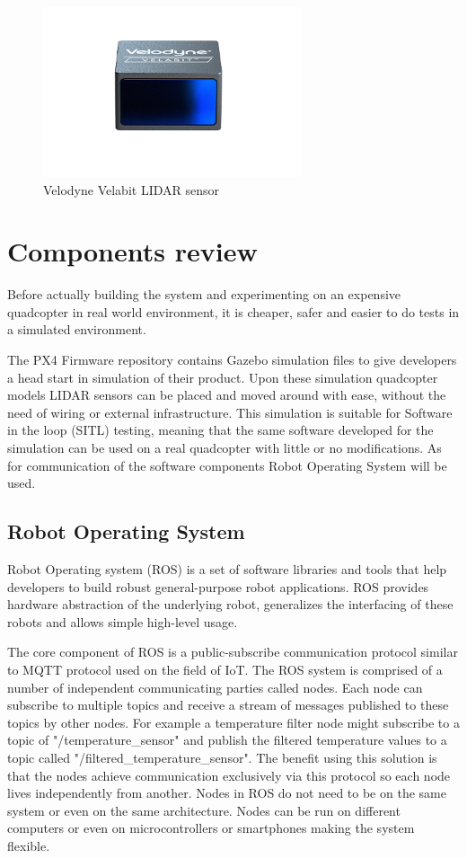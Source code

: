 \begin{figure}[!h]
    \centering
    \includegraphics[height=50mm, keepaspectratio]{figures/velabit.png}
    \caption{Velodyne Velabit LIDAR sensor\cite{VelodyneWebsite}}
    \label{fig:velabit}
\end{figure}



\section{Components review} \label{chap:components}
Before actually building the system and experimenting on an expensive quadcopter in real world environment,
it is cheaper, safer and easier to do tests in a simulated environment. 

The PX4 Firmware repository\cite{PX4Repository} contains Gazebo simulation files to give developers a head 
start in simulation of their product. Upon these simulation quadcopter models LIDAR sensors can be placed and 
moved around with ease, without the need of wiring or external infrastructure. This simulation is 
suitable for Software in the loop (SITL) testing, meaning that the same software developed for the simulation
can be used on a real quadcopter with little or no modifications. As for communication of the software 
components Robot Operating System will be used.


\subsection{Robot Operating System}
Robot Operating system (ROS) is a set of software libraries and tools that help developers to build robust 
general-purpose robot applications\cite{ROSWebsite}. ROS provides hardware abstraction of the underlying 
robot, generalizes the interfacing of these robots and allows simple high-level usage.


The core component of ROS is a public-subscribe communication protocol similar to MQTT protocol
used on the field of IoT. The ROS system is comprised of a number of independent communicating parties called 
nodes. Each node can subscribe to multiple topics and receive a stream of messages published to these topics 
by other nodes. For example a temperature filter node might subscribe to a topic of "/temperature\_sensor" 
and publish the filtered temperature values to a topic called "/filtered\_temperature\_sensor". 
The benefit using this solution is that the nodes achieve communication exclusively via this protocol 
so each node lives independently from another. Nodes in ROS do not need to be on the same system or 
even on the same architecture. Nodes can be run on different computers or even on microcontrollers or 
smartphones making the system flexible.

